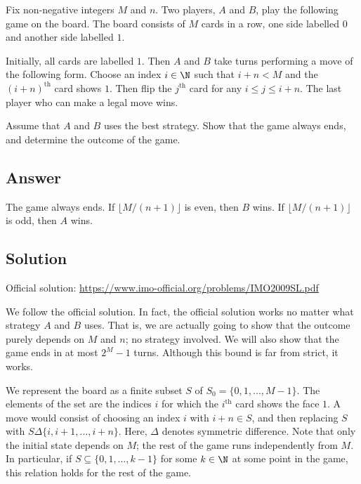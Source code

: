 Fix non-negative integers $M$ and $n$.
Two players, $A$ and $B$, play the following game on the board.
The board consists of $M$ cards in a row, one side labelled $0$ and another side labelled $1$.

Initially, all cards are labelled $1$.
Then $A$ and $B$ take turns performing a move of the following form.
Choose an index $i \in \N$ such that $i + n < M$ and the $(i + n)^{\text{th}}$ card shows $1$.
Then flip the $j^{\text{th}}$ card for any $i \leq j \leq i + n$.
The last player who can make a legal move wins.

Assume that $A$ and $B$ uses the best strategy.
Show that the game always ends, and determine the outcome of the game.



\subsection*{Answer}

The game always ends.
If $\lfloor M/(n + 1) \rfloor$ is even, then $B$ wins.
If $\lfloor M/(n + 1) \rfloor$ is odd, then $A$ wins.



\subsection*{Solution}

Official solution: \url{https://www.imo-official.org/problems/IMO2009SL.pdf}

We follow the official solution.
In fact, the official solution works no matter what strategy $A$ and $B$ uses.
That is, we are actually going to show that the outcome purely depends on $M$ and $n$; no strategy involved.
We will also show that the game ends in at most $2^M - 1$ turns.
Although this bound is far from strict, it works.

We represent the board as a finite subset $S$ of $S_0 = \{0, 1, \ldots, M - 1\}$.
The elements of the set are the indices $i$ for which the $i^{\text{th}}$ card shows the face $1$.
A move would consist of choosing an index $i$ with $i + n \in S$, and then replacing $S$ with $S \Delta \{i, i + 1, \ldots, i + n\}$.
Here, $\Delta$ denotes symmetric difference.
Note that only the initial state depends on $M$; the rest of the game runs independently from $M$.
In particular, if $S \subseteq \{0, 1, \ldots, k - 1\}$ for some $k \in \N$ at some point in the game, this relation holds for the rest of the game.


